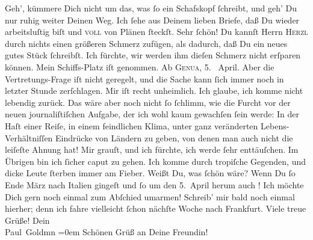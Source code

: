\begin{ledgroupsized}[t]{13cm}
           \pstart
           Geh’, kümmere Dich nicht um das, was ſo ein Schafskopf ſchreibt, und geh’ Du nur ruhig weiter Deinen Weg.
               Ich ſehe aus Deinem lieben Briefe, daß Du wieder arbeitsluſtig biſt und \textsc{voll} von Plänen ſteckſt. Sehr ſchön! Du kannſt Herrn \textsc{Herzl} durch nichts einen größeren Schmerz zufügen, als dadurch, daß Du ein neues
               gutes Stück ſchreibſt. Ich fürchte, wir werden ihm dieſen Schmerz nicht erſparen
               können.\pend
           \pstart
           Mein Schiffs-Platz iſt
               genommen. Ab \textsc{Genua}, 5.  April.
               Aber die Vertretungs-Frage iſt
               nicht geregelt, und die {\pb}Sache kann ſich immer noch
               in letzter Stunde zerſchlagen.\pend
           \pstart
           Mir iſt recht unheimlich. Ich glaube, ich komme nicht lebendig zurück. Das wäre aber
               noch nicht ſo ſchlimm, wie die Furcht vor der neuen journaliſtiſchen Aufgabe, der ich
                  \strikeout{\textcolor{gray}{w}} wohl kaum gewachſen ſein werde: In der Haſt einer Reiſe, in einem feindlichen
               Klima, unter ganz veränderten Lebens-Verhältniſſen Eindrücke von Ländern zu geben,
                  \strikeout{\textcolor{gray}{×}}{ } von denen man auch nicht die
               leiſeſte Ahnung hat! Mir grauſt, und ich fürchte, ich werde ſehr enttäuſchen. Im
               Übrigen bin ich ſicher caput zu gehen. Ich komme durch tropiſche {\pb}Gegenden, und dicke Leute ſterben immer am
               Fieber.\pend
           \pstart
           Weißt Du, was ſchön wäre? Wenn Du ſo  Ende März nach Italien gingeſt und ſo um den 5. April herum
               auch \label{K_L02841-4v}\label{K_L02841-4h}!
               Ich möchte Dich gern noch einmal zum Abſchied umarmen!\pend
           \pstart
           Schreib’ mir bald noch einmal hierher; denn ich fahre vielleicht ſchon nächſte Woche
               nach Frankfurt.\pend
           \pstart
           Viele treue Grüße!\pend
           \pstart
           Dein {\\[\baselineskip]}\spacefill\mbox{Paul Goldmn}\pend
           \leftskip=0em{}\pstart
           \noindent{}Schönen Grüß an Deine Freundin!\pend
           
         
         \endnumbering{}\end{ledgroupsized}  \newcommand{\dateiname}{L02841}\newcommand{\titel}{Paul Goldmann an Arthur Schnitzler, 7. 3. [1898]}\newcommand{\editorInnen}{Martin Anton Müller und Laura Untner}
      